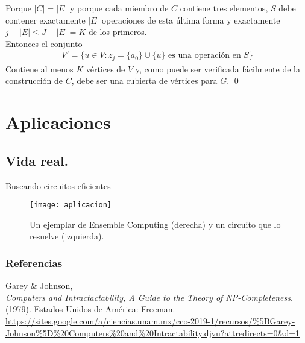 \documentclass{beamer}
\begin{document}

 \begin{frame}
    Porque $|C| = |E|$ y porque cada miembro de $C$ contiene tres elementos, $S$ debe contener exactamente $|E|$ operaciones de esta última forma y exactamente $j-|E| \leq J - |E|=K$ de los primeros. \\

    Entonces el conjunto
    \begin{align*}
        V' = \{ u \in V : z_j = \{ a_0\} \cup  \{u\} \text{ es una operación en }S \}
    \end{align*}
    Contiene al menos $K$ vértices de $V$ y, como puede ser verificada fácilmente de la construcción de $C$, debe ser una cubierta de vértices para $G$. \qed
\end{frame}

\section{Aplicaciones}

\subsection{Vida real.}

\begin{frame}{Buscando circuitos eficientes}
    \begin{figure}[H]
        \centering
        \texttt{[image: aplicacion]}
        \caption{Un ejemplar de Ensemble Computing (derecha) y un circuito que lo resuelve (izquierda).}
    \end{figure}
\end{frame}


\begin{frame}
\frametitle{Referencias}
\footnotesize{
\begin{thebibliography}{99} %
 Garey \& Johnson, \\
\emph{Computers and Intractactability, A Guide to the Theory of NP-Completeness}.
\newblock (1979). Estados Unidos de América: Freeman.
\newblock \url{https://sites.google.com/a/ciencias.unam.mx/cco-2019-1/recursos/\%5BGarey-Johnson\%5D\%20Computers\%20and\%20Intractability.djvu?attredirects=0\&d=1}

\end{thebibliography}
}
\end{frame}
\end{document}
